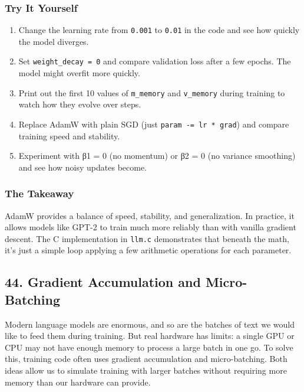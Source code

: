 \documentclass[
  letterpaper,
  DIV=11,
  numbers=noendperiod]{scrreprt}
\providecommand{\tightlist}{%
  \setlength{\itemsep}{0pt}\setlength{\parskip}{0pt}}
\begin{document}
\subsubsection{Try It Yourself}\label{try-it-yourself-31}

\begin{enumerate}
\def\labelenumi{\arabic{enumi}.}
\tightlist
\item
  Change the learning rate from \texttt{0.001} to \texttt{0.01} in the
  code and see how quickly the model diverges.
\item
  Set \texttt{weight\_decay\ =\ 0} and compare validation loss after a
  few epochs. The model might overfit more quickly.
\item
  Print out the first 10 values of \texttt{m\_memory} and
  \texttt{v\_memory} during training to watch how they evolve over
  steps.
\item
  Replace AdamW with plain SGD (just \texttt{param\ -=\ lr\ *\ grad})
  and compare training speed and stability.
\item
  Experiment with β1 = 0 (no momentum) or β2 = 0 (no variance smoothing)
  and see how noisy updates become.
\end{enumerate}

\subsubsection{The Takeaway}\label{the-takeaway-32}

AdamW provides a balance of speed, stability, and generalization. In
practice, it allows models like GPT-2 to train much more reliably than
with vanilla gradient descent. The C implementation in \texttt{llm.c}
demonstrates that beneath the math, it's just a simple loop applying a
few arithmetic operations for each parameter.

\subsection{44. Gradient Accumulation and
Micro-Batching}\label{gradient-accumulation-and-micro-batching}

Modern language models are enormous, and so are the batches of text we
would like to feed them during training. But real hardware has limits: a
single GPU or CPU may not have enough memory to process a large batch in
one go. To solve this, training code often uses gradient accumulation
and micro-batching. Both ideas allow us to simulate training with larger
batches without requiring more memory than our hardware can provide.
\end{document}
